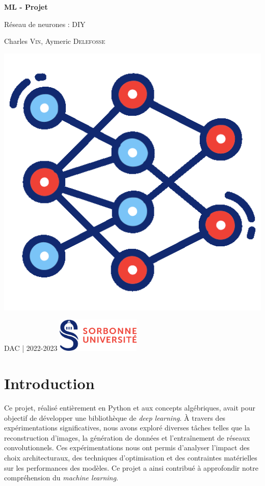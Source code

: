 \documentclass{article}
\begin{document}
\begin{titlepage}
    \begin{center}
        \vspace*{1cm}

        \Huge
        \textbf{ML - Projet}

        \LARGE
        Réseau de neurones : DIY

        \Large
        Charles \textsc{Vin}, Aymeric \textsc{Delefosse}

        \vfill
        \includegraphics[width=.5\textwidth]{neural-network.png}    
        \vfill

        \large
        DAC | 2022-2023 \hfill 
        \includegraphics[width=0.30\textwidth]{logo.png}
        \hfill
        
        
    \end{center}
\end{titlepage}

\tableofcontents
\newpage

\section{Introduction}

Ce projet, réalisé entièrement en Python et aux concepts algébriques, avait pour objectif de développer une bibliothèque de \textit{deep learning}. À travers des expérimentations significatives, nous avons exploré diverses tâches telles que la reconstruction d'images, la génération de données et l'entraînement de réseaux convolutionnels. Ces expérimentations nous ont permis d'analyser l'impact des choix architecturaux, des techniques d'optimisation et des contraintes matérielles sur les performances des modèles. Ce projet a ainsi contribué à approfondir notre compréhension du \textit{machine learning}.
\end{document}
